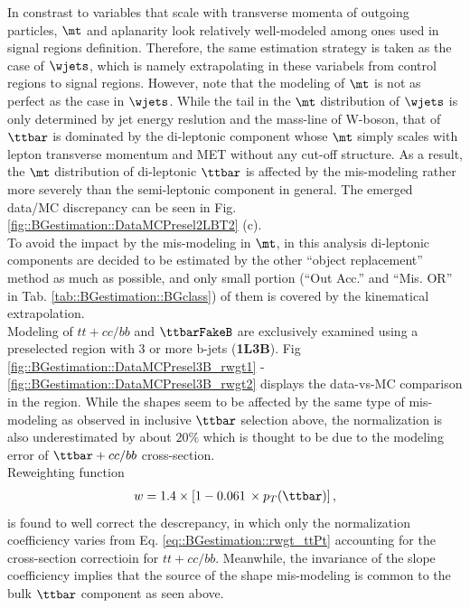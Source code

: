 \clearpage


\clearpage

In constrast to variables that scale with transverse momenta of outgoing particles, $\mt$ and aplanarity look relatively well-modeled among ones used in signal regions definition. Therefore, the same estimation strategy is taken as the case of $\wjets$, which is namely extrapolating in these variabels from control regions to signal regions. However, note that the modeling of $\mt$ is not as perfect as the case in $\wjets$. While the tail in the $\mt$ distribution of $\wjets$ is only determined by jet energy reslution and the mass-line of W-boson, that of $\ttbar$ is dominated by the di-leptonic component whose $\mt$ simply scales with lepton transverse momentum and MET without any cut-off structure. As a result, the $\mt$ distribution of di-leptonic $\ttbar$ is affected by the mis-modeling rather more severely than the semi-leptonic component in general. The emerged data/MC discrepancy can be seen in Fig. \ref{fig::BGestimation::DataMCPresel2LBT2} (c). \\

To avoid the impact by the mis-modeling in $\mt$, in this analysis di-leptonic components are decided to be estimated by the other ``object replacement'' method as much as possible, and only small portion (``Out Acc.'' and ``Mis. OR'' in Tab. \ref{tab::BGestimation::BGclass}) of them is covered by the kinematical extrapolation. \\



Modeling of $tt+cc/bb$ and $\ttbarFakeB$ are exclusively examined using a preselected region with 3 or more b-jets (\textbf{1L3B}). Fig \ref{fig::BGestimation::DataMCPresel3B_rwgt1} - \ref{fig::BGestimation::DataMCPresel3B_rwgt2} displays the data-vs-MC comparison in the region. While the shapes seem to be affected by the same type of mis-modeling as observed in inclusive $\ttbar$ selection above, the normalization is also underestimated by about $20\%$ which is thought to be due to the modeling error of $\ttbar+cc/bb$ cross-section. \\

Reweighting function
\begin{align}
w = 1.4 \times \left[ 1 - 0.061 \,\times p_T(\ttbar) \right] \label{eq::BGestimation::rwgt_ttPt3B},
\end{align}
is found to well correct the descrepancy, in which only the normalization coefficiency varies from Eq. \ref{eq::BGestimation::rwgt_ttPt} accounting for the cross-section correctioin for $tt+cc/bb$. Meanwhile, the invariance of the slope coefficiency implies that the source of the shape mis-modeling is common to the bulk $\ttbar$ component as seen above. \\

